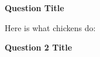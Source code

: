     \Question \textbf{Question Title}

    Here is what chickens do:


    \Question
    \textbf{Question 2 Title}
